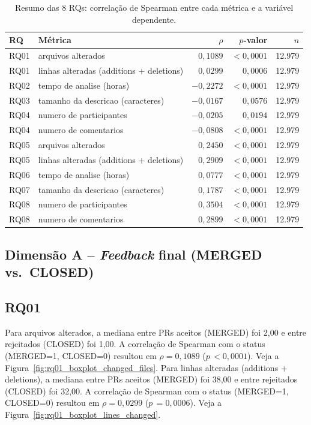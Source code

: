 \documentclass[11pt,a4paper]{article}
\begin{document}
\begin{table}[H]
\centering
\caption{Resumo das 8 RQs: correla\c{c}\~ao de Spearman entre cada m\'etrica e a vari\'avel dependente.}
\label{tab:rqs}
\begin{tabular}{llrrr}
\toprule
RQ & M\'etrica & $\rho$ & $p$-valor & $n$ \\
\midrule
RQ01 & arquivos alterados & $0{,}1089$ & $< 0{,}0001$ & 12.979 \\
RQ01 & linhas alteradas (additions + deletions) & $0{,}0299$ & $0{,}0006$ & 12.979 \\
RQ02 & tempo de analise (horas) & $-0{,}2272$ & $< 0{,}0001$ & 12.979 \\
RQ03 & tamanho da descricao (caracteres) & $-0{,}0167$ & $0{,}0576$ & 12.979 \\
RQ04 & numero de participantes & $-0{,}0205$ & $0{,}0194$ & 12.979 \\
RQ04 & numero de comentarios & $-0{,}0808$ & $< 0{,}0001$ & 12.979 \\
RQ05 & arquivos alterados & $0{,}2450$ & $< 0{,}0001$ & 12.979 \\
RQ05 & linhas alteradas (additions + deletions) & $0{,}2909$ & $< 0{,}0001$ & 12.979 \\
RQ06 & tempo de analise (horas) & $0{,}0777$ & $< 0{,}0001$ & 12.979 \\
RQ07 & tamanho da descricao (caracteres) & $0{,}1787$ & $< 0{,}0001$ & 12.979 \\
RQ08 & numero de participantes & $0{,}3504$ & $< 0{,}0001$ & 12.979 \\
RQ08 & numero de comentarios & $0{,}2899$ & $< 0{,}0001$ & 12.979 \\
\bottomrule
\end{tabular}
\end{table}

\subsection{Dimens\~ao A -- \emph{Feedback} final (MERGED vs.\ CLOSED)}

\subsection*{RQ01}
Para arquivos alterados, a mediana entre PRs aceitos (MERGED) foi 2,00 e entre rejeitados (CLOSED) foi 1,00. A correla\c{c}\~ao de Spearman com o status (MERGED=1, CLOSED=0) resultou em $\rho = 0{,}1089$ ($p\,< 0{,}0001$). Veja a Figura~\ref{fig:rq01_boxplot_changed_files}. Para linhas alteradas (additions + deletions), a mediana entre PRs aceitos (MERGED) foi 38,00 e entre rejeitados (CLOSED) foi 32,00. A correla\c{c}\~ao de Spearman com o status (MERGED=1, CLOSED=0) resultou em $\rho = 0{,}0299$ ($p\,= 0{,}0006$). Veja a Figura~\ref{fig:rq01_boxplot_lines_changed}.
\end{document}
